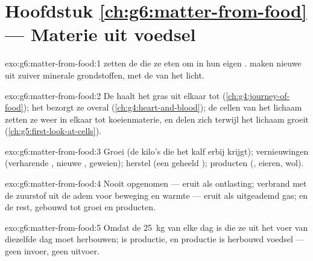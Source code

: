 \section*{Hoofdstuk \ref{ch:g6:matter-from-food} --- Materie uit voedsel}

\begin{solution}{exo:g6:matter-from-food:1}
 zetten de  die ze eten om in hun eigen
.  maken nieuwe  uit
zuiver minerale grondstoffen, met de  van het licht.
\end{solution}

\begin{solution}{exo:g6:matter-from-food:2}
De  haalt het gras uit elkaar tot 
(\cref{ch:g4:journey-of-food}); het  bezorgt ze overal
(\cref{ch:g4:heart-and-blood}); de cellen van het lichaam zetten ze weer
in elkaar tot koeienmaterie, en delen zich terwijl het lichaam groeit
(\cref{ch:g5:first-look-at-cells}).
\end{solution}

\begin{solution}{exo:g6:matter-from-food:3}
Groei (de kilo's die het kalf erbij krijgt); vernieuwingen (verharende
, nieuwe , geweien); herstel (een geheeld ); producten
(, eieren, wol).
\end{solution}

\begin{solution}{exo:g6:matter-from-food:4}
Nooit opgenomen --- eruit als ontlasting; verbrand met de zuurstof uit
de adem voor beweging en warmte --- eruit als uitgeademd gas; en de rest,
gebouwd tot groei en producten.
\end{solution}

\begin{solution}{exo:g6:matter-from-food:5}
Omdat de \qty{25}{kg}  van elke dag  is die ze uit
het voer van diezelfde dag moet herbouwen;  is productie, en productie
is herbouwd voedsel --- geen invoer, geen uitvoer.
\end{solution}

